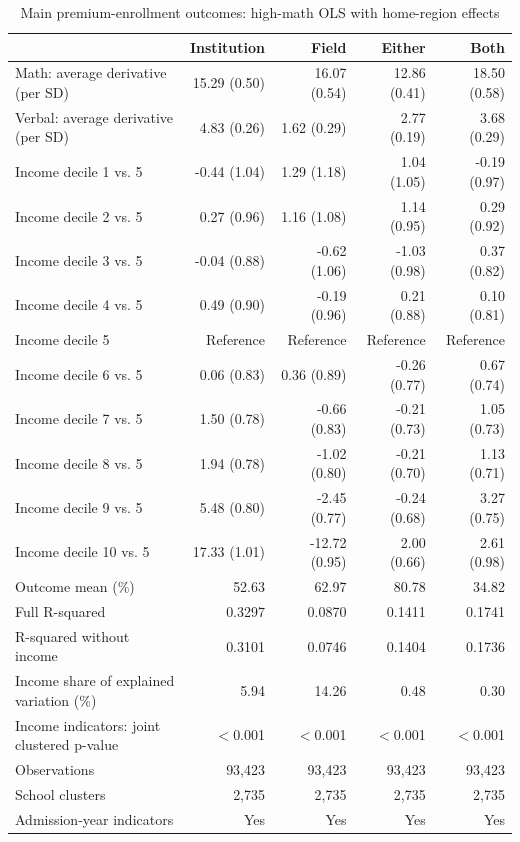 \begin{table}[!htbp]\centering
\caption{Main premium-enrollment outcomes: high-math OLS with home-region effects}
\label{tab:region-d5-high-math-premium-cubic-income-main}
\small
\begin{tabular}{lrrrr}\hline\hline
 & Institution & Field & Either & Both \\ \hline
Math: average derivative (per SD) & 15.29 (0.50) & 16.07 (0.54) & 12.86 (0.41) & 18.50 (0.58) \\
Verbal: average derivative (per SD) & 4.83 (0.26) & 1.62 (0.29) & 2.77 (0.19) & 3.68 (0.29) \\
Income decile 1 vs. 5 & -0.44 (1.04) & 1.29 (1.18) & 1.04 (1.05) & -0.19 (0.97) \\
Income decile 2 vs. 5 & 0.27 (0.96) & 1.16 (1.08) & 1.14 (0.95) & 0.29 (0.92) \\
Income decile 3 vs. 5 & -0.04 (0.88) & -0.62 (1.06) & -1.03 (0.98) & 0.37 (0.82) \\
Income decile 4 vs. 5 & 0.49 (0.90) & -0.19 (0.96) & 0.21 (0.88) & 0.10 (0.81) \\
Income decile 5 & Reference & Reference & Reference & Reference \\
Income decile 6 vs. 5 & 0.06 (0.83) & 0.36 (0.89) & -0.26 (0.77) & 0.67 (0.74) \\
Income decile 7 vs. 5 & 1.50 (0.78) & -0.66 (0.83) & -0.21 (0.73) & 1.05 (0.73) \\
Income decile 8 vs. 5 & 1.94 (0.78) & -1.02 (0.80) & -0.21 (0.70) & 1.13 (0.71) \\
Income decile 9 vs. 5 & 5.48 (0.80) & -2.45 (0.77) & -0.24 (0.68) & 3.27 (0.75) \\
Income decile 10 vs. 5 & 17.33 (1.01) & -12.72 (0.95) & 2.00 (0.66) & 2.61 (0.98) \\
\hline
Outcome mean (\%) & 52.63 & 62.97 & 80.78 & 34.82 \\
Full R-squared & 0.3297 & 0.0870 & 0.1411 & 0.1741 \\
R-squared without income & 0.3101 & 0.0746 & 0.1404 & 0.1736 \\
Income share of explained variation (\%) & 5.94 & 14.26 & 0.48 & 0.30 \\
Income indicators: joint clustered p-value & $<$0.001 & $<$0.001 & $<$0.001 & $<$0.001 \\
Observations & 93,423 & 93,423 & 93,423 & 93,423 \\
School clusters & 2,735 & 2,735 & 2,735 & 2,735 \\
Admission-year indicators & Yes & Yes & Yes & Yes \\

\end{tabular}
\end{table}

